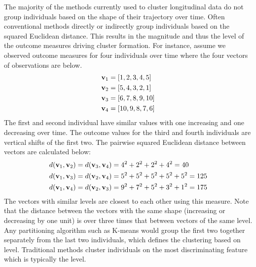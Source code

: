 The majority of the methods currently used to cluster longitudinal data do not group individuals based on the shape of their trajectory over time. Often conventional methods directly or indirectly group individuals based on the squared Euclidean distance. This results in the magnitude and thus the level of the outcome measures driving cluster formation. For instance, assume we observed outcome measures for four individuals over time where the four vectors of observations are below.
\begin{align*}
\mathbf v_{1}&=[1,2,3,4,5]\\
\mathbf v_{2}&=[5,4,3,2,1]\\
\mathbf v_{3}&=[6,7,8,9,10]\\
\mathbf v_{4}&=[10,9,8,7,6]
\end{align*}
The first and second individual have similar values with one increasing and one decreasing over time. The outcome values for the third and fourth individuals are vertical shifts of the first two. The pairwise squared Euclidean distance between vectors are calculated below:
\begin{align*}
d(\mathbf v_{1},\mathbf v_{2}) = d(\mathbf v_{3},\mathbf v_{4}) &= 4^{2}+2^{2}+2^{2}+4^{2} = 40\\
d(\mathbf v_{1},\mathbf v_{3}) = d(\mathbf v_{2},\mathbf v_{4}) &= 5^{2}+5^{2}+5^{2}+5^{2}+5^{2}=125\\
d(\mathbf v_{1},\mathbf v_{4}) = d(\mathbf v_{2},\mathbf v_{3}) &= 9^{2}+7^{2}+5^{2}+3^{2}+1^{2}=175
\end{align*}
The vectors with similar levels are closest to each other using this measure. Note that the distance between the vectors with the same shape (increasing or decreasing by one unit) is over three times that between vectors of the same level. Any partitioning algorithm such as K-means would group the first two together separately from the last two individuals, which defines the clustering based on level. Traditional methods cluster individuals on the most discriminating feature which is typically the level.

